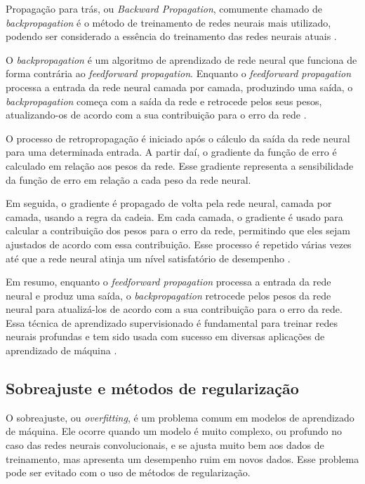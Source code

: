 Propagação para trás, ou \textit{Backward Propagation}, comumente chamado de \textit{backpropagation} é o método de treinamento de redes neurais mais utilizado, podendo ser considerado a essência do treinamento das redes neurais atuais \cite{builtinML}.

O \textit{backpropagation} é um algoritmo de aprendizado de rede neural que funciona de forma contrária ao \textit{feedforward propagation}. 
Enquanto o \textit{feedforward propagation} processa a entrada da rede neural camada por camada, produzindo uma saída, o \textit{backpropagation} começa com a saída da rede e retrocede pelos seus pesos, atualizando-os de acordo com a sua contribuição para o erro da rede \cite{Rumelhart1986}.

O processo de retropropagação é iniciado após o cálculo da saída da rede neural para uma determinada entrada. A partir daí, o gradiente da função de erro é calculado em relação aos pesos da rede. 
Esse gradiente representa a sensibilidade da função de erro em relação a cada peso da rede neural.

Em seguida, o gradiente é propagado de volta pela rede neural, camada por camada, usando a regra da cadeia. 
Em cada camada, o gradiente é usado para calcular a contribuição dos pesos para o erro da rede, permitindo que eles sejam ajustados de acordo com essa contribuição. 
Esse processo é repetido várias vezes até que a rede neural atinja um nível satisfatório de desempenho \cite{Goodfellow2016}.

Em resumo, enquanto o \textit{feedforward propagation} processa a entrada da rede neural e produz uma saída, o \textit{backpropagation} retrocede pelos pesos da rede neural para atualizá-los de acordo com a sua contribuição para o erro da rede.
Essa técnica de aprendizado supervisionado é fundamental para treinar redes neurais profundas e tem sido usada com sucesso em diversas aplicações de aprendizado de máquina \cite{Goodfellow2016}.

\subsection{Sobreajuste e métodos de regularização}

O sobreajuste, ou \textit{overfitting}, é um problema comum em modelos de aprendizado de máquina. 
Ele ocorre quando um modelo é muito complexo, ou profundo no caso das redes neurais convolucionais, e se ajusta muito bem aos dados de treinamento, mas apresenta um desempenho ruim em novos dados. 
Esse problema pode ser evitado com o uso de métodos de regularização.

